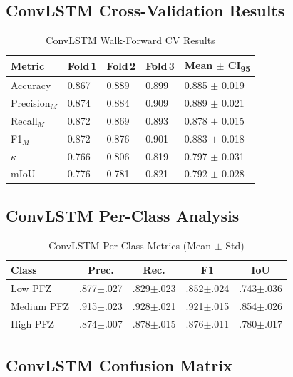 \documentclass[conference]{IEEEtran}
\begin{document}
\subsection{ConvLSTM Cross-Validation Results}

\begin{table}[htbp]
\caption{ConvLSTM Walk-Forward CV Results}
\label{tab:lstm_cv}
\centering
\footnotesize
\begin{tabular}{lC{1cm}C{1cm}C{1cm}C{1.8cm}}
\toprule
\textbf{Metric} & \textbf{Fold\,1} & \textbf{Fold\,2} & \textbf{Fold\,3}
  & \textbf{Mean $\pm$ CI\textsubscript{95}}\\
\midrule
Accuracy      & 0.867 & 0.889 & 0.899 & 0.885 $\pm$ 0.019\\
Precision$_M$ & 0.874 & 0.884 & 0.909 & 0.889 $\pm$ 0.021\\
Recall$_M$    & 0.872 & 0.869 & 0.893 & 0.878 $\pm$ 0.015\\
F1$_M$        & 0.872 & 0.876 & 0.901 & 0.883 $\pm$ 0.018\\
$\kappa$      & 0.766 & 0.806 & 0.819 & 0.797 $\pm$ 0.031\\
mIoU          & 0.776 & 0.781 & 0.821 & 0.792 $\pm$ 0.028\\
\bottomrule
\end{tabular}
\end{table}

\subsection{ConvLSTM Per-Class Analysis}

\begin{table}[htbp]
\caption{ConvLSTM Per-Class Metrics (Mean $\pm$ Std)}
\label{tab:lstm_perclass}
\centering
\footnotesize
\begin{tabular}{lcccc}
\toprule
\textbf{Class} & \textbf{Prec.} & \textbf{Rec.} & \textbf{F1}
  & \textbf{IoU}\\
\midrule
Low PFZ    & .877$\pm$.027 & .829$\pm$.023 & .852$\pm$.024 & .743$\pm$.036\\
Medium PFZ & .915$\pm$.023 & .928$\pm$.021 & .921$\pm$.015 & .854$\pm$.026\\
High PFZ   & .874$\pm$.007 & .878$\pm$.015 & .876$\pm$.011 & .780$\pm$.017\\
\bottomrule
\end{tabular}
\end{table}

\subsection{ConvLSTM Confusion Matrix}
\end{document}
